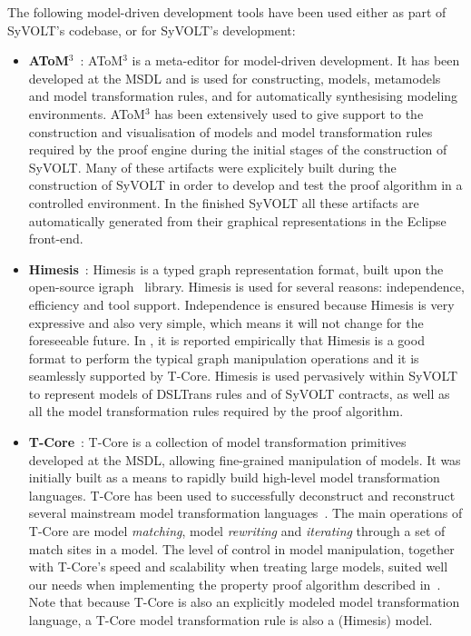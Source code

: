 The following model-driven development tools have been used either as part of
SyVOLT's codebase, or for SyVOLT's development:
\begin{itemize}

  \item \textbf{AToM$^3$}~\cite{}: AToM$^3$ is a meta-editor for model-driven
  development. It has been developed at the MSDL and is used for constructing,
  models, metamodels and model transformation rules, and for automatically
  synthesising modeling environments.
  AToM$^3$ has been extensively used to give support to the construction and
  visualisation of models and model transformation rules required by the proof
  engine during the initial stages of the construction of SyVOLT. 
  Many of these artifacts were explicitely built during the construction
  of SyVOLT in order to develop and test the proof algorithm in a controlled
  environment. In the finished SyVOLT all these artifacts are automatically
  generated from their graphical representations in the Eclipse front-end.\\

  \item \textbf{Himesis}~\cite{Provost2006}: Himesis is a typed graph representation
  format, built upon the open-source igraph~\cite{} library. 
Himesis is used for several reasons: independence, efficiency and tool support.
Independence is ensured because Himesis is very expressive and also very simple,
which means it will not change for the foreseeable future.
In \cite{Syriani2010b}, it is reported empirically that Himesis is a good format
to perform the typical graph manipulation operations and it is seamlessly
supported by T-Core.  
  Himesis is used pervasively within SyVOLT to represent models of 
  DSLTrans rules and of SyVOLT contracts, as well as all the model
  transformation rules required by the proof algorithm.\\
  
  \item \textbf{T-Core}~\cite{Syriani2010a}: T-Core is a collection of model transformation
  primitives developed at the MSDL, allowing fine-grained manipulation of
  models. It was initially built as a means to rapidly build
  high-level model transformation languages. T-Core has been used to
  successfully deconstruct and reconstruct several mainstream model transformation
  languages~\cite{}. The main operations of T-Core are model \emph{matching},
  model \emph{rewriting} and \emph{iterating} through a set of match sites in a model.
  The level of control in model manipulation, together with T-Core's speed and
  scalability when treating large models, suited well our needs when
  implementing the property proof algorithm described in~\cite{Lucio2014}. Note that because
  T-Core is also an explicitly modeled model transformation language, a T-Core
  model transformation rule is also a (Himesis) model.\\


\end{itemize}
